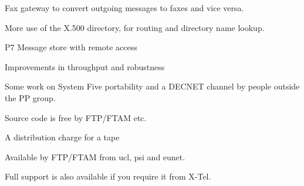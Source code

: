 \begin{bwslide}
\begin{nrtc}
\item	Fax gateway to convert outgoing messages to faxes and vice
versa.

\item	More use of the X.500 directory, for routing and directory
name lookup.

\item	P7 Message store with remote access

\item	Improvements in throughput and robustness

\item	Some work on System Five portability and a DECNET channel by
people outside the PP group. 
\end{nrtc}
\end{bwslide}

\begin{bwslide}
\begin{nrtc}
\item	Source code is free by FTP/FTAM etc.
\item	A distribution charge for a tape

\item	Available by FTP/FTAM from ucl, psi and eunet.

\item	Full support is also available if you require it from X-Tel.
\end{nrtc}
\end{bwslide}


